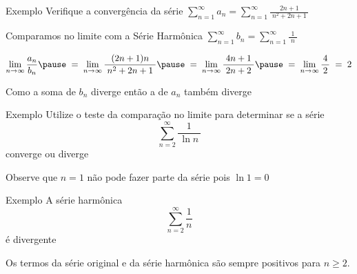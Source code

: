 \documentclass[fleqn,utf8,aspectratio=169,12pt]{beamer}
\begin{document}
\addtocounter{exemplo}{1}
\begin{frame}{Exemplo \theexemplo}
  Verifique a convergência da série
  \quad
  \(
    \sum_{n=1}^{\infty} a_n = \sum_{n=1}^{\infty} \frac{2n+1}{\;n^2+2n+1\;}
  \)

  \pause
  \vspace{\baselineskip}
  Comparamos no limite com a Série Harmônica
  \quad
  \(
    \sum_{n=1}^{\infty} b_n = \sum_{n=1}^{\infty} \frac{1}{\;n\;}
  \)

  \pause
  \vspace{0.3\baselineskip}
  \[
  \lim_{n\to\infty} \frac{a_n}{b_n}              \pause \;=\;
  \lim_{n\to\infty} \frac{(2n+1)n}{\;n^2+2n+1\;} \pause \;=\;
  \lim_{n\to\infty} \frac{4n+1}{\;2n+2\;}        \pause \;=\;
  \lim_{n\to\infty} \frac{\,4\,}{2}                     \;=\; 2
  \]

  \pause
  \vspace{0.5\baselineskip}
  Como a soma de \(b_n\) diverge então a de \(a_n\) também diverge
\end{frame}

\addtocounter{exemplo}{1}
\begin{frame}{Exemplo \theexemplo}
  Utilize o teste da comparação no limite para determinar se a série
  \[
    \sum_{n=2}^{\infty} \frac{1}{\,\ln n\,}
  \]
   converge ou diverge

   \pause
   \vspace{\baselineskip}
   Observe que $n=1$ não pode fazer parte da série pois $\ln 1 = 0$
\end{frame}

\begin{frame}{Exemplo \theexemplo}
  A série harmônica
  \[
    \sum_{n=2}^{\infty} \frac{1}{n}
  \]
  é divergente

  \pause
  \vspace{\baselineskip}
  Os termos da série original e da série harmônica são sempre positivos para $n\geq 2$.
\end{frame}
\end{document}
